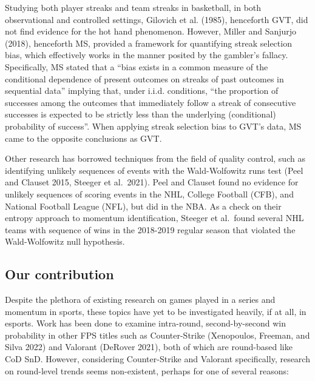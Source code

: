 \documentclass{article}
\begin{document}
Studying both player streaks and team streaks in basketball, in both
observational and controlled settings, Gilovich et al. (1985),
henceforth GVT, did not find evidence for the hot hand phenomenon.
However, Miller and Sanjurjo (2018), henceforth MS, provided a framework
for quantifying streak selection bias, which effectively works in the
manner posited by the gambler's fallacy. Specifically, MS stated that a
``bias exists in a common measure of the conditional dependence of
present outcomes on streaks of past outcomes in sequential data''
implying that, under i.i.d. conditions, ``the proportion of successes
among the outcomes that immediately follow a streak of consecutive
successes is expected to be strictly less than the underlying
(conditional) probability of success''. When applying streak selection
bias to GVT's data, MS came to the opposite conclusions as GVT.

Other research has borrowed techniques from the field of quality
control, such as identifying unlikely sequences of events with the
Wald-Wolfowitz runs test (Peel and Clauset 2015, Steeger et al.~2021).
Peel and Clauset found no evidence for unlikely sequences of scoring
events in the NHL, College Football (CFB), and National Football League
(NFL), but did in the NBA. As a check on their entropy approach to
momentum identification, Steeger et al.~found several NHL teams with
sequence of wins in the 2018-2019 regular season that violated the
Wald-Wolfowitz null hypothesis.

\hypertarget{our-contribution}{%
\subsection{Our contribution}\label{our-contribution}}

Despite the plethora of existing research on games played in a series
and momentum in sports, these topics have yet to be investigated
heavily, if at all, in esports. Work has been done to examine
intra-round, second-by-second win probability in other FPS titles such
as Counter-Strike (Xenopoulos, Freeman, and Silva 2022) and Valorant
(DeRover 2021), both of which are round-based like CoD SnD. However,
considering Counter-Strike and Valorant specifically, research on
round-level trends seems non-existent, perhaps for one of several
reasons:
\end{document}
